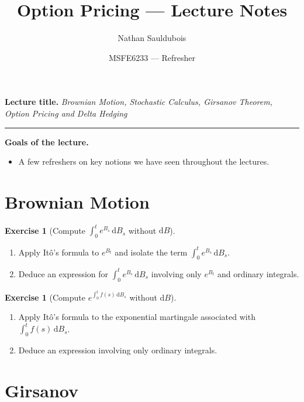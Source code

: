 \documentclass[11pt]{article}
\title{Option Pricing --- Lecture Notes}
\author{Nathan Sauldubois}
\date{MSFE6233 --- Refresher}
\theoremstyle{plain}
\theoremstyle{definition}
\newtheorem{exercise}[theorem]{Exercise}
\theoremstyle{remark}
\begin{document}
\maketitle
\vspace{-1em}

\noindent\textbf{Lecture title.}
\emph{Brownian Motion, Stochastic Calculus, Girsanov Theorem, Option Pricing and Delta Hedging}

\vspace{0.5em}
\hrule
\vspace{1em}

\noindent\textbf{Goals of the lecture.}
\begin{itemize}[leftmargin=1.4em]
    \item A few refreshers on key notions we have seen throughout the lectures.
\end{itemize}

\tableofcontents
\bigskip

\section{Brownian Motion}


\begin{exercise}[Compute $\int_0^t e^{B_s}\,\mathrm{d} B_s$ without $\mathrm{d} B$]
\begin{enumerate}
\item Apply It\^o's formula to $e^{B_t}$ and isolate the term $\int_0^t e^{B_s}\,\mathrm{d} B_s$.
\item Deduce an expression for $\int_0^t e^{B_s}\,\mathrm{d} B_s$ involving only $e^{B_t}$ and ordinary integrals.
\end{enumerate}
\end{exercise}

\begin{exercise}[Compute $e^{\int_0^t f(s)\,\mathrm{d} B_s}$ without $\mathrm{d} B$]
\begin{enumerate}
\item Apply It\^o's formula to the exponential martingale associated with $\int_0^t f(s)\,\mathrm{d}B_s$.
\item Deduce an expression involving only ordinary integrals.
\end{enumerate}
\end{exercise}

\section{Girsanov}
\end{document}
